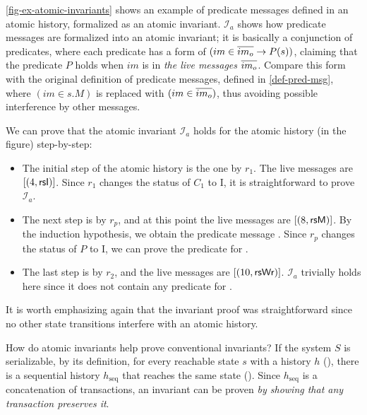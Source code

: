 \autoref{fig-ex-atomic-invariants} shows an example of predicate messages defined in an atomic history, formalized as an atomic invariant.
$\mathcal{I}_a$ shows how predicate messages are formalized into an atomic invariant; it is basically a conjunction of predicates, where each predicate has a form of $(im \in \overline{im_o} \to P(s))$, claiming that the predicate $P$ holds when $im$ is in \emph{the live messages} $\overline{im_o}$.
Compare this form with the original definition of predicate messages, defined in \autoref{def-pred-msg}, where $(im \in s.M)$ is replaced with $(im \in \overline{im_o})$, thus avoiding possible interference by other messages.

We can prove that the atomic invariant $\mathcal{I}_a$ holds for the atomic history (in the figure) step-by-step:
\begin{itemize}[leftmargin=*]
\item The initial step of the atomic history is the one by $r_1$. The live messages are $\lbrack (4, \textsf{rsI}) \rbrack$. Since $r_1$ changes the status of $C_1$ to I, it is straightforward to prove $\mathcal{I}_a$.
\item The next step is by $r_p$, and at this point the live messages are $\lbrack (8, \textsf{rsM}) \rbrack$. By the induction hypothesis, we obtain the predicate message . Since $r_p$ changes the status of $P$ to I, we can prove the predicate for .
\item The last step is by $r_2$, and the live messages are $\lbrack (10, \textsf{rsWr}) \rbrack$. $\mathcal{I}_a$ trivially holds here since it does not contain any predicate for .
\end{itemize}
It is worth emphasizing again that the invariant proof was straightforward since no other state transitions interfere with an atomic history.

How do atomic invariants help prove conventional invariants?
If the system $S$ is serializable, by its definition, for every reachable state $s$ with a history $h$ (), there is a sequential history $h_\textrm{seq}$ that reaches the same state ().
Since $h_\textrm{seq}$ is a concatenation of transactions, an invariant can be proven \emph{by showing that any transaction preserves it}.


